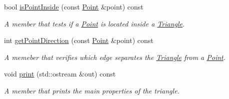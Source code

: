 \begin{DoxyCompactItemize}
\item 
bool \hyperlink{classTriangle_a76c1691d2b89f8aef8913b0315371429}{isPointInside} (const \hyperlink{classPoint}{Point} \&point) const 
\begin{DoxyCompactList}\small\item\em A member that tests if a \hyperlink{classPoint}{Point} is located inside a \hyperlink{classTriangle}{Triangle}. \item\end{DoxyCompactList}\item 
int \hyperlink{classTriangle_ad9d72fba98eaa955fca0ebc08584ee27}{getPointDirection} (const \hyperlink{classPoint}{Point} \&point) const 
\begin{DoxyCompactList}\small\item\em A memeber that verifies which edge separates the \hyperlink{classTriangle}{Triangle} from a \hyperlink{classPoint}{Point}. \item\end{DoxyCompactList}\item 
void \hyperlink{classTriangle_a083c32066c8c469e3e0f622ed4ce3e8a}{print} (std::ostream \&out) const 
\begin{DoxyCompactList}\small\item\em A member that prints the main properties of the triangle. \item\end{DoxyCompactList}\end{DoxyCompactItemize}
